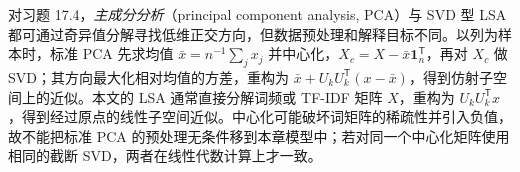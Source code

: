 对习题 17.4，\emph{主成分分析}（principal component analysis, PCA）与 SVD 型 LSA 都可通过奇异值分解寻找低维正交方向，但数据预处理和解释目标不同。以列为样本时，标准 PCA 先求均值 $\bar x=n^{-1}\sum_jx_j$ 并中心化，$X_c=X-\bar x\mathbf1_n^{\mathsf T}$，再对 $X_c$ 做 SVD；其方向最大化相对均值的方差，重构为 $\bar x+U_kU_k^{\mathsf T}(x-\bar x)$，得到仿射子空间上的近似。本文的 LSA 通常直接分解词频或 TF-IDF 矩阵 $X$，重构为 $U_kU_k^{\mathsf T}x$，得到经过原点的线性子空间近似。中心化可能破坏词矩阵的稀疏性并引入负值，故不能把标准 PCA 的预处理无条件移到本章模型中；若对同一个中心化矩阵使用相同的截断 SVD，两者在线性代数计算上才一致。





